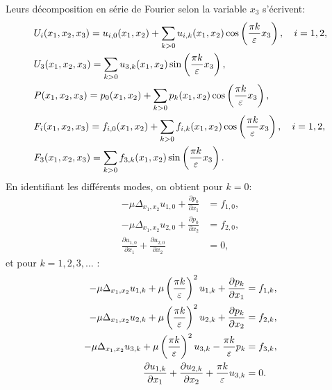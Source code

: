 Leurs décomposition en série de Fourier selon la variable $x_3$ s'écrivent:
\begin{align}
  &U_i(x_1, x_2, x_3) = u_{i,0}(x_1, x_2) %
                       + \sum_{k > 0} u_{i,k}(x_1, x_2)%
                       \cos\parent{\frac{\pi k}{\thickness}x_3}, \quad i = 1, 2,\label{eq:fourier-coeff-def-1}\\
  &U_3(x_1, x_2, x_3) = \sum_{k > 0} u_{3,k}(x_1, x_2)%
                        \sin\parent{\frac{\pi k}{\thickness}x_3},\label{eq:fourier-coeff-def-2}\\
  &P(x_1, x_2, x_3) = p_0(x_1, x_2) %
                      + \sum_{k>0}p_k(x_1, x_2)%
                      \cos\parent{\frac{\pi k}{\thickness}x_3},\label{eq:fourier-coeff-def-3}\\
  &F_i(x_1, x_2, x_3) = f_{i, 0}(x_1, x_2) %
                        + \sum_{k > 0}f_{i,k}(x_1, x_2)%
                        \cos\parent{\frac{\pi k}{\thickness}x_3}, \quad i = 1,2,\label{eq:fourier-coeff-def-4}\\
  &F_3(x_1, x_2, x_3) = \sum_{k > 0}f_{3,k}(x_1,x_2)%
                        \sin\parent{\frac{\pi k}{\thickness}x_3}.\label{eq:fourier-coeff-def-5}
\end{align}
En identifiant les différents modes, on obtient pour $k = 0$:
\begin{align}
  -\mu \Delta_{x_1, x_2}u_{1, 0} + \frac{\partial p_0}{\partial x_1} %
  &= f_{1,0},\label{eq:fourier-fund-1}\\
  -\mu \Delta_{x_1, x_2}u_{2, 0} + \frac{\partial p_0}{\partial x_2} %
  &= f_{2,0},\label{eq:fourier-fund-2}\\
  \frac{\partial u_{1, 0}}{\partial x_1} +   \frac{\partial u_{2, 0}}{\partial x_2} %
  &= 0,\label{eq:fourier-fund-3}
\end{align}
et pour $k = 1, 2, 3,\dots$ :
\begin{align}
  - \mu\Delta_{x_1, x_2}u_{1, k}%
  + \mu\parent{\frac{\pi k}{\thickness}}^2 u_{1,k}%
  + \frac{\partial p_k}{\partial x_1} %
  &= f_{1,k}, \label{eq:fourier-harm-1}\\
  - \mu\Delta_{x_1, x_2}u_{2, k} %
  + \mu\parent{\frac{\pi k}{\thickness}}^2 u_{2,k} %
  + \frac{\partial p_k}{\partial x_2} %
  &= f_{2,k}, \label{eq:fourier-harm-2} \\
  - \mu\Delta_{x_1, x_2}u_{3, k} %
  + \mu\parent{\frac{\pi k}{\thickness}}^2 u_{3,k} %
  - \frac{\pi k}{\thickness}p_k %
  &= f_{3,k}, \label{eq:fourier-harm-3}\\
    \frac{\partial u_{1,k}}{\partial x_1} %
  + \frac{\partial u_{2,k}}{\partial x_2} %
  + \frac{\pi k}{\thickness} u_{3, k} %
  &= 0. \label{eq:fourier-incompressibility}
\end{align}
